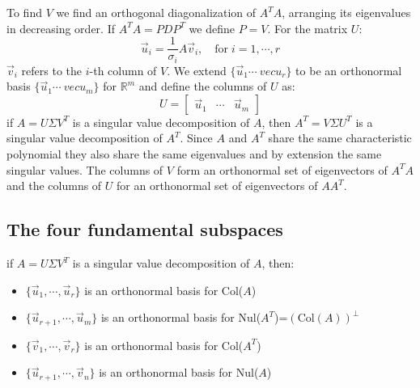 \documentclass[11pt, a4paper]{article}
\newcommand*{\R}{\ensuremath{\mathbb{R}}}
\begin{document}
To find $V$ we find an orthogonal diagonalization of $A^TA$, arranging its eigenvalues in decreasing order. If $A^TA = PDP^T$ we define $P=V$. For the matrix $U$:
\begin{equation}
	\vec{u}_i = \frac{1}{\sigma_i} A \vec{v}_i, \quad \text{for}\; i=1,\cdots, r
\end{equation}
$\vec{v}_i$ refers to the $i$-th column of $V$. We extend $\{\vec{u}_1 \cdots \ vec{u}_r \}$ to be an orthonormal basis $\{\vec{u}_1 \cdots \ vec{u}_m \}$ for $\R^m$ and define the columns of $U$ as:
\begin{equation}
	U = 
	\begin{bmatrix}
		\vec{u}_1 & \cdots & \vec{u}_m
	\end{bmatrix}
\end{equation}
if $A=U\Sigma V^T$ is a singular value decomposition of $A$, then $A^T = V\Sigma U^T$ is a singular value decomposition of $A^T$. Since $A$ and $A^T$ share the same characteristic polynomial they also share the same eigenvalues and by extension the same singular values. The columns of $V$ form an orthonormal set of eigenvectors of $A^T A$ and the columns of $U$ for an orthonormal set of eigenvectors of $AA^T$.



\subsection{The four fundamental subspaces}
if $A=U\Sigma V^T$ is a singular value decomposition of $A$, then:
\begin{itemize}
	\item $\{ \vec{u}_1, \cdots, \vec{u}_r \}$ is an orthonormal basis for Col($A$)
	\item $\{ \vec{u}_{r+1}, \cdots, \vec{u}_m \}$ is an orthonormal basis for Nul($A^T$)=$(\text{Col}(A))^\perp$
	\item $\{ \vec{v}_1, \cdots, \vec{v}_r \}$ is an orthonormal basis for Col($A^T$)
	\item $\{ \vec{u}_{r+1}, \cdots, \vec{v}_n \}$ is an orthonormal basis for Nul($A$)
\end{itemize}
\end{document}
